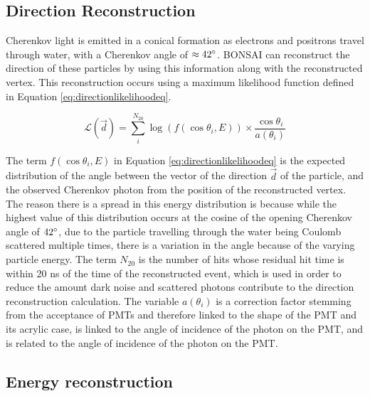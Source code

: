 \subsection{Direction Reconstruction}

Cherenkov light is emitted in a conical formation as electrons and positrons travel through water, with a Cherenkov angle of $\approx 42\degree$. BONSAI can reconstruct the direction of these particles by using this information along with the reconstructed vertex. This reconstruction occurs using a maximum likelihood function defined in Equation \ref{eq:directionlikelihoodeq}.

\begin{equation}
    \mathcal{L}(\vec{d})=\sum_{i}^{N_{20}} \log (f(\cos\theta_{i}, E))\times\frac{\cos\theta_{i}}{a(\theta_{i})}
    \label{eq:directionlikelihoodeq}
\end{equation}

The term $f(\cos\theta_{i},E)$ in Equation \ref{eq:directionlikelihoodeq} is the expected distribution of the angle between the vector of the direction $\vec{d}$ of the particle, and the observed Cherenkov photon from the position of the reconstructed vertex. The reason there is a spread in this energy distribution is because while the highest value of this distribution occurs at the cosine of the opening Cherenkov angle of $42\degree$, due to the particle travelling through the water being Coulomb scattered multiple times, there is a variation in the angle because of the varying particle energy. The term $N_{20}$ is the number of hits whose residual hit time is within 20 ns of the time of the reconstructed event, which is used in order to reduce the amount dark noise and scattered photons contribute to the direction reconstruction calculation. The variable $a(\theta_{i})$ is a correction factor stemming from the acceptance of PMTs and therefore linked to the shape of the PMT and its acrylic case, is linked to the angle of incidence of the photon on the PMT, and is related to the angle of incidence of the photon on the PMT.


\subsection{Energy reconstruction}

